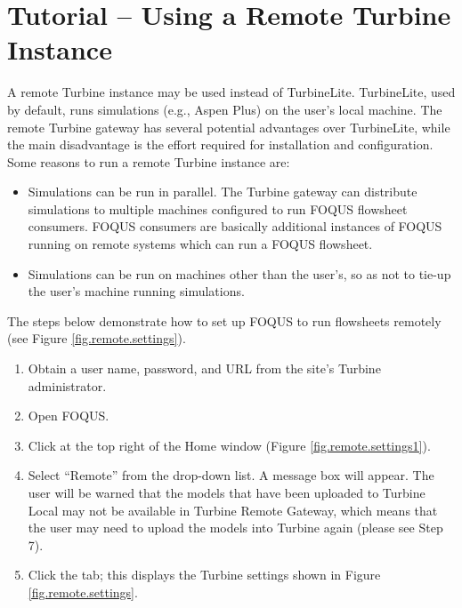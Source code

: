 \section{Tutorial -- Using a Remote Turbine Instance}\label{tutorial.fs.remote.turbine}

A remote Turbine instance may be used instead of TurbineLite. TurbineLite, used by default, runs simulations (e.g., Aspen Plus) on the user's local machine. The remote Turbine gateway has several potential advantages over TurbineLite, while the main disadvantage is the effort required for installation and configuration. Some reasons to run a remote Turbine instance are:
\begin{itemize}
	\item Simulations can be run in parallel.  The Turbine gateway can distribute simulations to multiple machines configured to run FOQUS flowsheet consumers.  FOQUS consumers are basically additional instances of FOQUS running on remote systems which can run a FOQUS flowsheet.
	\item Simulations can be run on machines other than the user's, so as not to tie-up the user's machine running simulations. 
\end{itemize}

The steps below demonstrate how to set up FOQUS to run flowsheets remotely (see Figure \ref{fig.remote.settings}).

\begin{enumerate}
\item Obtain a user name, password, and URL from the site's Turbine administrator.
\item Open FOQUS.
\item Click  at the top right of the Home window (Figure \ref{fig.remote.settings1}).
\item Select ``Remote'' from the  drop-down list. A message box will appear. The user will be warned that the models that have been uploaded to Turbine Local may not be available in Turbine Remote Gateway, which means that the user may need to upload the models into Turbine again (please see Step 7).
\item Click the  tab; this displays the Turbine settings shown in Figure \ref{fig.remote.settings}.
\end{enumerate}


